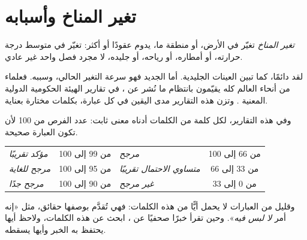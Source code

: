 \section{تغير المناخ وأسبابه}

\begin{definition}\label{def:g9:climate-past-and-present:climate-change}
\emph{تغير المناخ} تغيّر في  الأرض، أو  منطقة ما،
يدوم عقودًا أو أكثر: تغيّر في متوسط درجة حرارته، أو أمطاره، أو رياحه، أو جليده،
لا مجرد فصل واحد غير عادي.
\end{definition}

لقد  دائمًا، كما تبين العينات الجليدية. أما الجديد فهو سرعة التغير
الحالي، وسببه. فعلماء من أنحاء العالم كله يقيّمون بانتظام ما نُشر عن ، في
تقارير الهيئة الحكومية الدولية المعنية . وتزن هذه التقارير مدى
اليقين في كل عبارة، بكلمات مختارة بعناية.

وفي هذه التقارير، لكل كلمة من الكلمات أدناه معنى ثابت: عدد الفرص من 100 لأن
تكون العبارة صحيحة.

\begin{center}
{\small
\begin{tabular}{|l|c||l|c|}
\hline
\emph{مؤكد تقريبًا} & من 99 إلى 100 & \emph{مرجح} & من 66 إلى 100 \\
\emph{مرجح للغاية} & من 95 إلى 100 & \emph{متساوي الاحتمال تقريبًا} & من 33 إلى 66 \\
\emph{مرجح جدًا} & من 90 إلى 100 & \emph{غير مرجح} & من 0 إلى 33 \\
\hline
\end{tabular}}
\end{center}

\noindent وقليل من العبارات لا يحمل أيًّا من هذه الكلمات: فهي تُقدَّم بوصفها
حقائق، مثل «إنه أمر \emph{لا لبس فيه}». وحين تقرأ خبرًا صحفيًا عن ، ابحث
عن هذه الكلمات، ولاحظ أيها يحتفظ به الخبر وأيها
يسقطه.

